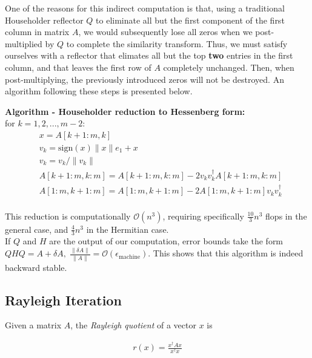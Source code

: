 \documentclass[11pt]{article}
\begin{document}
One of the reasons for this indirect computation is that, using a traditional Householder reflector $Q$ to eliminate all but the first component of the first column in matrix $A$, we would subsequently lose all zeros when we post-multiplied by $Q$ to complete the similarity transform. Thus, we must satisfy ourselves with a reflector that elimates all but the top \textbf{two} entries in the first column, and that leaves the first row of $A$ completely unchanged. Then, when post-multiplying, the previously introduced zeros will not be destroyed. An algorithm following these steps is presented below. \\

\begin{framed}
\textbf{Algorithm - Householder reduction to Hessenberg form:} \\
\hspace{5mm} for $k = 1, 2, ..., m-2$:
\begin{align*}
  &x = A[k+1 : m, k] \\
  &v_k = \textrm{sign}(x) \| x \| e_1 + x \\
  &v_k = v_k / \|v_k \| \\
  &A[k+1:m, k:m] = A[k+1:m, k:m] - 2 v_k v_k^\dagger A[k+1:m, k:m] \\
  &A[1:m, k+1:m] = A[1:m, k+1:m] - 2 A[1:m, k+1:m] v_k v_k^\dagger \\
\end{align*}
\end{framed}

This reduction is computationally $\mathcal{O}(n^3)$, requiring specifically $\frac{10}{3} n^3$ flops in the general case, and $\frac{4}{3} n^3$ in the Hermitian case. \\

If $Q$ and $H$ are the output of our computation, error bounds take the form $QHQ = A + \delta A, \; \frac{\| \delta A \|}{\| A \|} = \mathcal{O}(\epsilon_{\textrm{machine}})$. This shows that this algorithm is indeed backward stable.

\subsection{Rayleigh Iteration}

Given a matrix $A$, the \textit{Rayleigh quotient} of a vector $x$ is

\begin{align*}
  r(x) = \frac{x^\dagger A x}{x^\dagger x}
\end{align*}
\end{document}
